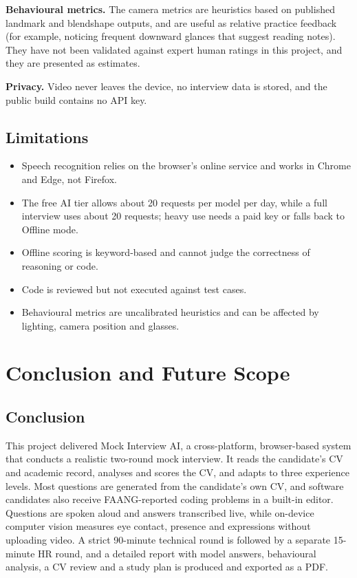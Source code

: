 \documentclass[12pt,a4paper,oneside]{report}
\begin{document}
\textbf{Behavioural metrics.} The camera metrics are heuristics based on published landmark and blendshape outputs, and are useful as relative practice feedback (for example, noticing frequent downward glances that suggest reading notes). They have not been validated against expert human ratings in this project, and they are presented as estimates.

\textbf{Privacy.} Video never leaves the device, no interview data is stored, and the public build contains no API key.

\section{Limitations}
\begin{itemize}
  \item Speech recognition relies on the browser's online service and works in Chrome and Edge, not Firefox.
  \item The free AI tier allows about 20 requests per model per day, while a full interview uses about 20 requests; heavy use needs a paid key or falls back to Offline mode.
  \item Offline scoring is keyword-based and cannot judge the correctness of reasoning or code.
  \item Code is reviewed but not executed against test cases.
  \item Behavioural metrics are uncalibrated heuristics and can be affected by lighting, camera position and glasses.
\end{itemize}

\chapter{Conclusion and Future Scope}\label{ch:conc}

\section{Conclusion}
This project delivered Mock Interview AI, a cross-platform, browser-based system that conducts a realistic two-round mock interview. It reads the candidate's CV and academic record, analyses and scores the CV, and adapts to three experience levels. Most questions are generated from the candidate's own CV, and software candidates also receive FAANG-reported coding problems in a built-in editor. Questions are spoken aloud and answers transcribed live, while on-device computer vision measures eye contact, presence and expressions without uploading video. A strict 90-minute technical round is followed by a separate 15-minute HR round, and a detailed report with model answers, behavioural analysis, a CV review and a study plan is produced and exported as a PDF.
\end{document}
